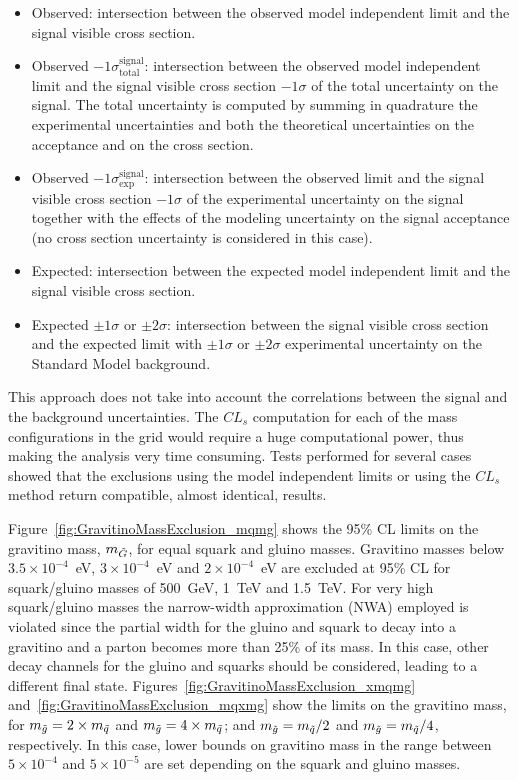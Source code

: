 \begin{itemize}
\item{Observed:}
intersection between the observed model independent limit and the signal visible cross section.
\item{Observed $- 1\sigma_{\text{total}}^{\text{signal}}$:}
intersection between the observed model independent limit and the signal visible cross section $- 1\sigma$ of the total uncertainty on the signal.
The total uncertainty is computed by summing in quadrature the experimental uncertainties and both the theoretical uncertainties on the acceptance and on the cross section.
\item{Observed $- 1\sigma_{\text{exp}}^{\text{signal}}$:}
intersection between the observed limit and the signal visible cross section $-1\sigma$ of the experimental uncertainty on the signal together with the effects of the modeling uncertainty on the signal acceptance (no cross section uncertainty is considered in this case).
\item{Expected:}
intersection between the expected model independent limit and the signal visible cross section.
\item{Expected $\pm 1\sigma$ or $\pm 2\sigma$:}
intersection between the signal visible cross section and the expected limit with $\pm 1\sigma$ or $\pm 2\sigma$ experimental uncertainty on the Standard Model background.
\end{itemize}

This approach does not take into account the correlations between the signal and the background uncertainties.
The $CL_s$ computation for each of the mass configurations in the grid would require a huge computational power, thus making the analysis very time consuming.
Tests performed for several cases showed that the exclusions using the model independent limits or using the $CL_s$ method return compatible, almost identical, results.

Figure~\ref{fig:GravitinoMassExclusion_mqmg} shows the 95\% CL limits on the gravitino mass, $m_{\tilde{G}}$, for equal squark and gluino masses.
Gravitino masses below $3.5\times10^{-4}$~eV, $3\times10^{-4}$~eV and $2\times10^{-4}$~eV are excluded at 95\% CL for squark/gluino masses of 500~GeV, 1~TeV and 1.5~TeV.
For very high squark/gluino masses the narrow-width approximation (NWA) employed is violated since the partial width for the gluino and squark to decay into a gravitino and a parton becomes more than 25\% of its mass.
In this case, other decay channels for the gluino and squarks should be considered, leading to a different final state.
Figures~\ref{fig:GravitinoMassExclusion_xmqmg} and~\ref{fig:GravitinoMassExclusion_mqxmg} show the limits on the gravitino mass, for $m_{\gluino} = 2\times m_{\squark}$ and $m_{\gluino} = 4\times m_{\squark}$; and $m_{\tilde{g}} = m_{\tilde{q}}/2$ and $m_{\tilde{g}} = m_{\tilde{q}}/4$, respectively.
In this case, lower bounds on gravitino mass in the range between $5\times10^{-4}$ and $5\times10^{-5}$ are set depending on the squark and gluino masses.

